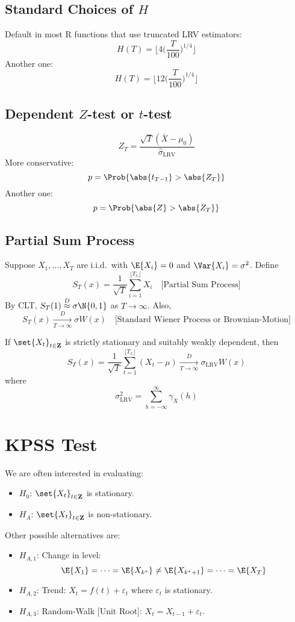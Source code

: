 \subsection*{Standard Choices of $ H $}
Default in most R functions that use truncated LRV estimators:
\[ H(T)=\biggl\lfloor 4\biggl(\frac{T}{100} \biggr)^{1/4}\biggr\rfloor \]
Another one:
\[ H(T)=\biggl\lfloor 12\biggl(\frac{T}{100} \biggr)^{1/4}\biggr\rfloor \]
\subsection*{Dependent $ Z $-test or $ t $-test}
\[ Z_T=\frac{\sqrt{T}(\bar{X}-\mu_0)}{\hat{\sigma}_{\text{LRV}}}  \]
More conservative:
\[ p=\Prob{\abs{t_{T-1}}>\abs{Z_T}} \]
Another one:
\[ p=\Prob{\abs{Z}>\abs{Z_T}} \]
\subsection*{Partial Sum Process}
Suppose $ X_1,\ldots,X_T $ are i.i.d.\ with $ \E{X_i}=0 $ and $ \Var{X_i}=\sigma^2 $.
Define
\[ S_T(x)=\frac{1}{\sqrt{T}} \sum_{i=1}^{\lfloor T_x\rfloor}X_i\quad\text{[Partial Sum Process]}  \]
By CLT, $ S_T(1)\stackrel{D}{\approx}\sigma \N{0,1} $ as $ T\to\infty $. Also,
\[ S_T(x)\xrightarrow[T\to\infty]{D}\sigma W(x)\quad\text{[Standard Wiener Process or Brownian-Motion]} \]
\begin{Theorem}{}{}
    If $ \set{X_t}_{t\in\mathbf{Z}} $ is strictly stationary and suitably weakly
    dependent, then
    \[ S_T(x)=\frac{1}{\sqrt{T}} \sum_{t=1}^{\lfloor T_x\rfloor}(X_t-\mu)\xrightarrow[T\to\infty]{D}\sigma_{\text{LRV}}W(x)  \]
    where
    \[ \sigma_{\text{LRV}}^2=\sum_{h=-\infty}^{\infty} \gamma_X(h) \]
\end{Theorem}
\section{KPSS Test}
We are often interested in evaluating:
\begin{itemize}
    \item $ H_0 $: $ \set{X_t}_{t\in\mathbf{Z}} $ is stationary.
    \item $ H_A $: $ \set{X_t}_{t\in\mathbf{Z}} $ is non-stationary.
\end{itemize}
Other possible alternatives are:
\begin{itemize}
    \item $ H_{A,1} $: Change in level:
          \[ \E{X_1}=\cdots=\E{X_{k^*}}\ne \E{X_{k^*+1}}=\cdots=\E{X_T} \]
    \item $ H_{A,2} $: Trend: $ X_t=f(t)+\varepsilon_t $ where $ \varepsilon_t $ is stationary.
    \item $ H_{A,3} $: Random-Walk [Unit Root]: $ X_t=X_{t-1}+\varepsilon_t $.
\end{itemize}
